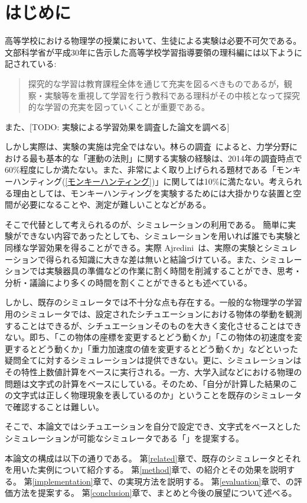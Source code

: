 \chapter{はじめに} \label{first}

高等学校における物理学の授業において、生徒による実験は必要不可欠である。文部科学省が平成30年に告示した高等学校学習指導要領の理科編には以下ように記されている:
\begin{quote}
探究的な学習は教育課程全体を通じて充実を図るべきものであるが，観察・実験等を重視して学習を行う教科である理科がその中核となって探究的な学習の充実を図っていくことが重要である。
\end{quote}
また、[TODO: 実験による学習効果を調査した論文を調べる]

しかし実際は、実験の実施は完全ではない。林らの調査~\cite{2015KJ00010038066}によると、力学分野における最も基本的な「運動の法則」に関する実験の経験は、2014年の調査時点で60\%程度にしか満たない。また、非常によく取り上げられる題材である「モンキーハンティング(\ref{モンキーハンティング})」に関しては10\%に満たない。考えられる理由としては、モンキーハンティングを実験するためには大掛かりな装置と空間が必要になることや、測定が難しいことなどがある。

そこで代替として考えられるのが、シミュレーションの利用である。
簡単に実験ができない内容であったとしても、シミュレーションを用いれば誰でも実験と同様な学習効果を得ることができる。実際 Ajredini~\cite{ajredini_real_2014}は、実際の実験とシミュレーションで得られる知識に大きな差は無いと結論づけている。また、シミュレーションでは実験器具の準備などの作業に割く時間を削減することができ、思考・分析・議論により多くの時間を割くことができるとも述べている。

しかし、既存のシミュレータでは不十分な点も存在する。一般的な物理学の学習用のシミュレータでは、設定されたシチュエーションにおける物体の挙動を観測することはできるが、シチュエーションそのものを大きく変化させることはできない。即ち、「この物体の座標を変更するとどう動くか」「この物体の初速度を変更するとどう動くか」「重力加速度の値を変更するとどう動くか」などといった疑問全てに対するシミュレーションは提供できない。更に、シミュレーションはその特性上数値計算をベースに実行される。一方、大学入試などにおける物理の問題は文字式の計算をベースにしている。そのため、「自分が計算した結果のこの文字式は正しく物理現象を表しているのか」ということを既存のシミュレータで確認することは難しい。

そこで、本論文ではシチュエーションを自分で設定でき、文字式をベースとしたシミュレーションが可能なシミュレータである「\simname」を提案する。

本論文の構成は以下の通りである。
第\ref{related}章で、既存のシミュレータとそれを用いた実例について紹介する。
第\ref{method}章で、\simname の紹介とその効果を説明する。
第\ref{implementation}章で、\simname の実現方法を説明する。
第\ref{evaluation}章で、\simname の評価方法を提案する。
第\ref{conclusion}章で、まとめと今後の展望について述べる。
